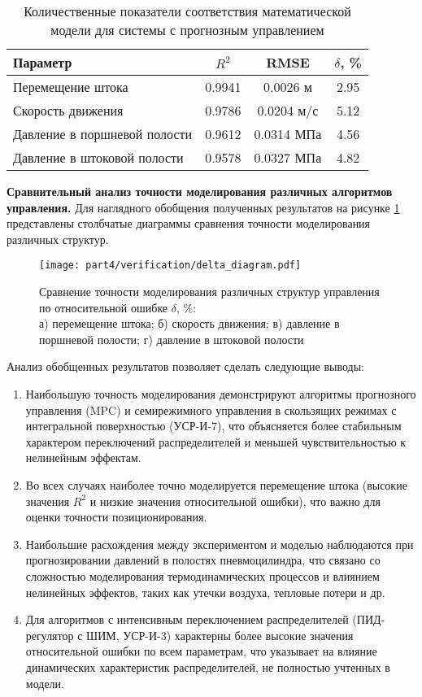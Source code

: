 \begin{table}[h]
	\centering
	\caption{Количественные показатели соответствия математической модели для системы с прогнозным управлением}
	\small
	\label{tab:mpc_validation}
	\begin{tabular}{lccc}
		\hline
		\textbf{Параметр}            & $R^2$        & RMSE             & $\delta$, \% \\
		\hline
		Перемещение штока            & \num{0.9941} & \num{0.0026} м   & \num{2.95}   \\
		Скорость движения            & \num{0.9786} & \num{0.0204} м/с & \num{5.12}   \\
		Давление в поршневой полости & \num{0.9612} & \num{0.0314} МПа & \num{4.56}   \\
		Давление в штоковой полости  & \num{0.9578} & \num{0.0327} МПа & \num{4.82}   \\
		\hline
	\end{tabular}
\end{table}

\textbf{Сравнительный анализ точности моделирования различных алгоритмов управления.}
Для наглядного обобщения полученных результатов на рисунке \ref{fig:validation_comparison} представлены столбчатые диаграммы
сравнения точности моделирования различных структур.
\begin{figure}[h]
	\centering
	\texttt{[image: part4/verification/delta\_diagram.pdf]}
	\caption{Сравнение точности моделирования различных структур управления по относительной ошибке $\delta$, \%:\\
		а) перемещение штока; б) скорость движения; в) давление в поршневой полости; г) давление в штоковой полости}
	\label{fig:validation_comparison}
\end{figure}

Анализ обобщенных результатов позволяет сделать следующие выводы:

\begin{enumerate}
	\item Наибольшую точность моделирования демонстрируют алгоритмы прогнозного управления (MPC) и семирежимного
	      управления в скользящих режимах с интегральной поверхностью (УСР-И-7),
	      что объясняется более стабильным характером переключений распределителей
	      и меньшей чувствительностью к нелинейным эффектам.
	\item Во всех случаях наиболее точно моделируется перемещение штока (высокие значения $R^2$ и низкие значения относительной ошибки),
	      что важно для оценки точности позиционирования.
	\item Наибольшие расхождения между экспериментом и моделью наблюдаются при прогнозировании давлений в полостях пневмоцилиндра,
	      что связано со сложностью моделирования термодинамических процессов и
	      влиянием нелинейных эффектов, таких как утечки воздуха, тепловые потери и др.
	\item Для алгоритмов с интенсивным переключением распределителей (ПИД-регулятор с ШИМ, УСР-И-3)
	      характерны более высокие значения
	      относительной ошибки по всем параметрам, что указывает на влияние динамических
	      характеристик распределителей, не полностью учтенных в модели.
\end{enumerate}

